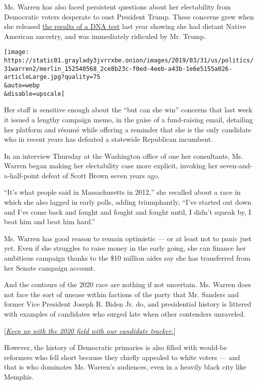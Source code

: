 Ms. Warren has also faced persistent questions about her electability
from Democratic voters desperate to oust President Trump. These concerns
grew when she released
\href{https://www.nytimes3xbfgragh.onion/2018/12/06/us/politics/elizabeth-warren-dna-test-2020.html}{the
results of a DNA test} last year showing she had distant Native American
ancestry, and was immediately ridiculed by Mr. Trump.

\texttt{[image: https://static01.graylady3jvrrxbe.onion/images/2019/03/31/us/politics/31warren2/merlin\_152540568\_2ce8b23c-f0ed-4eeb-a43b-1e6e5155a026-articleLarge.jpg?quality=75\\\&auto=webp\\\&disable=upscale]}

Her staff is sensitive enough about the ``but can she win'' concerns
that last week it issued a lengthy campaign memo, in the guise of a
fund-raising email, detailing her platform and résumé while offering a
reminder that she is the only candidate who in recent years has defeated
a statewide Republican incumbent.

In an interview Thursday at the Washington office of one her
consultants, Ms. Warren began making her electability case more
explicit, invoking her seven-and-a-half-point defeat of Scott Brown
seven years ago.

``It's what people said in Massachusetts in 2012,'' she recalled about a
race in which she also lagged in early polls, adding triumphantly,
``I've started out down and I've come back and fought and fought and
fought until, I didn't squeak by, I beat him and beat him hard.''

Ms. Warren has good reason to remain optimistic --- or at least not to
panic just yet. Even if she struggles to raise money in the early going,
she can finance her ambitious campaign thanks to the \$10 million aides
say she has transferred from her Senate campaign account.

And the contours of the 2020 race are nothing if not uncertain. Ms.
Warren does not face the sort of unease within factions of the party
that Mr. Sanders and former Vice President Joseph R. Biden Jr. do, and
presidential history is littered with examples of candidates who surged
late when other contenders unraveled.

{[}\emph{\href{https://www.nytimes3xbfgragh.onion/interactive/2019/us/politics/2020-presidential-candidates.html?action=click\&module=inline\&pgtype=Article}{Keep
up with the 2020 field with our candidate tracker.}}{]}

However, the history of Democratic primaries is also filled with
would-be reformers who fell short because they chiefly appealed to white
voters --- and that is who dominates Ms. Warren's audiences, even in a
heavily black city like Memphis.

